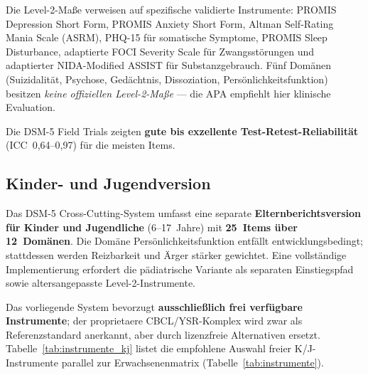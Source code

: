 \documentclass[11pt,a4paper]{article}
\begin{document}
Die Level-2-Ma\ss{}e verweisen auf spezifische validierte Instrumente: PROMIS Depression Short Form, PROMIS Anxiety Short Form, Altman Self-Rating Mania Scale (ASRM), PHQ-15 f\"ur somatische Symptome, PROMIS Sleep Disturbance, adaptierte FOCI Severity Scale f\"ur Zwangsst\"orungen und adaptierter NIDA-Modified ASSIST f\"ur Substanzgebrauch. F\"unf Dom\"anen (Suizidalit\"at, Psychose, Ged\"achtnis, Dissoziation, Pers\"onlichkeitsfunktion) besitzen \textit{keine offiziellen Level-2-Ma\ss{}e} --- die APA empfiehlt hier klinische Evaluation.

Die DSM-5 Field Trials \citep{Narrow2013} zeigten \textbf{gute bis exzellente Test-Retest-Reliabilit\"at} (ICC~0,64--0,97) f\"ur die meisten Items.

\subsection{Kinder- und Jugendversion}
\label{sec:screening_kj}

Das DSM-5 Cross-Cutting-System umfasst eine separate \textbf{Elternberichtsversion f\"ur Kinder und Jugendliche} (6--17~Jahre) mit \textbf{25~Items \"uber 12~Dom\"anen}. Die Dom\"ane \glqq Pers\"onlichkeitsfunktion\grqq{} entf\"allt entwicklungsbedingt; stattdessen werden Reizbarkeit und \"Arger st\"arker gewichtet. Eine vollst\"andige Implementierung erfordert die p\"adiatrische Variante als separaten Einstiegspfad sowie altersangepasste Level-2-Instrumente.

Das vorliegende System bevorzugt \textbf{ausschlie\ss{}lich frei verf\"ugbare Instrumente}; der proprietaere CBCL/YSR-Komplex \citep{Achenbach2001} wird zwar als Referenzstandard anerkannt, aber durch lizenzfreie Alternativen ersetzt. Tabelle~\ref{tab:instrumente_kj} listet die empfohlene Auswahl freier K/J-Instrumente parallel zur Erwachsenenmatrix (Tabelle~\ref{tab:instrumente}).
\end{document}
